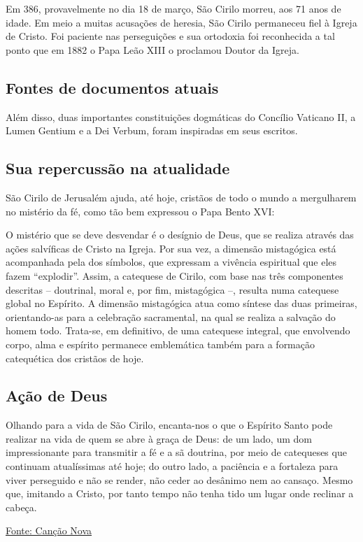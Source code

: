 \documentclass[18pt]{article}
\begin{document}
\begin{justify}
Em 386, provavelmente no dia 18 de março, São Cirilo morreu, aos 71 anos de idade. Em meio a muitas acusações de heresia, São Cirilo permaneceu fiel à Igreja de Cristo. Foi paciente nas perseguições e sua ortodoxia foi reconhecida a tal ponto que em 1882 o Papa Leão XIII o proclamou Doutor da Igreja. 

 \begin{justify}
  \subsection{Fontes de documentos atuais}
 \end{justify}

Além disso, duas importantes constituições dogmáticas do Concílio Vaticano II, a Lumen Gentium e a Dei Verbum, foram inspiradas em seus escritos.

 \begin{justify}
  \subsection{Sua repercussão na atualidade}
 \end{justify}

São Cirilo de Jerusalém ajuda, até hoje, cristãos de todo o mundo a mergulharem no mistério da fé, como tão bem expressou o Papa Bento XVI:

O mistério que se deve desvendar é o desígnio de Deus, que se realiza através das ações salvíficas de Cristo na Igreja. Por sua vez, a dimensão mistagógica está acompanhada pela dos símbolos, que expressam a vivência espiritual que eles fazem “explodir”. Assim, a catequese de Cirilo, com base nas três componentes descritas – doutrinal, moral e, por fim, mistagógica –, resulta numa catequese global no Espírito. A dimensão mistagógica atua como síntese das duas primeiras, orientando-as para a celebração sacramental, na qual se realiza a salvação do homem todo. Trata-se, em definitivo, de uma catequese integral, que envolvendo corpo, alma e espírito permanece emblemática também para a formação catequética dos cristãos de hoje.

 \begin{justify}
  \subsection{Ação de Deus}
 \end{justify}

Olhando para a vida de São Cirilo, encanta-nos o que o Espírito Santo pode realizar na vida de quem se abre à graça de Deus: de um lado, um dom impressionante para transmitir a fé e a sã doutrina, por meio de catequeses que continuam atualíssimas até hoje; do outro lado, a paciência e a fortaleza para viver perseguido e não se render, não ceder ao desânimo nem ao cansaço. Mesmo que, imitando a Cristo, por tanto tempo não tenha tido um lugar onde reclinar a cabeça.


\vfill

\href{https://santo.cancaonova.com/santo/sao-cirilo-de-jerusalem/}{Fonte: Canção Nova}

\end{justify}
\end{document}
